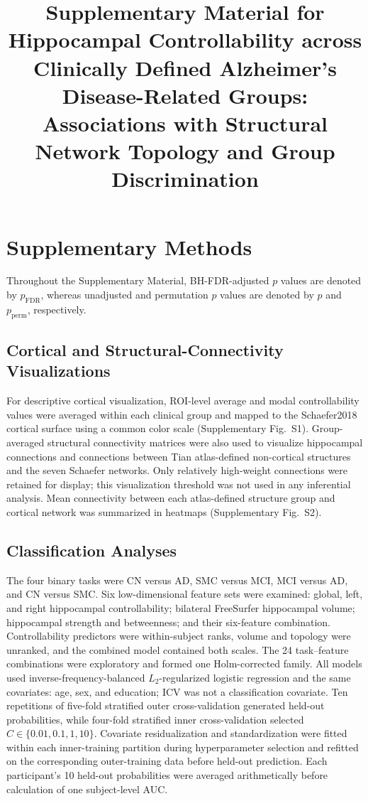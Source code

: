 \documentclass{article}
\title{Supplementary Material for Hippocampal Controllability across Clinically Defined Alzheimer's Disease-Related Groups: Associations with Structural Network Topology and Group Discrimination}
\author{}
\date{}
\begin{document}
\maketitle

\section{Supplementary Methods}

Throughout the Supplementary Material, BH-FDR-adjusted \(p\) values are denoted by \(p_{\mathrm{FDR}}\), whereas unadjusted and permutation \(p\) values are denoted by \(p\) and \(p_{\mathrm{perm}}\), respectively.

\subsection{Cortical and Structural-Connectivity Visualizations}
For descriptive cortical visualization, ROI-level average and modal controllability values were averaged within each clinical group and mapped to the Schaefer2018 cortical surface using a common color scale (Supplementary Fig.~S1). Group-averaged structural connectivity matrices were also used to visualize hippocampal connections and connections between Tian atlas-defined non-cortical structures and the seven Schaefer networks. Only relatively high-weight connections were retained for display; this visualization threshold was not used in any inferential analysis. Mean connectivity between each atlas-defined structure group and cortical network was summarized in heatmaps (Supplementary Fig.~S2).

\subsection{Classification Analyses}
The four binary tasks were CN versus AD, SMC versus MCI, MCI versus AD, and CN versus SMC. Six low-dimensional feature sets were examined: global, left, and right hippocampal controllability; bilateral FreeSurfer hippocampal volume; hippocampal strength and betweenness; and their six-feature combination. Controllability predictors were within-subject ranks, volume and topology were unranked, and the combined model contained both scales. The 24 task--feature combinations were exploratory and formed one Holm-corrected family. All models used inverse-frequency-balanced \(L_2\)-regularized logistic regression and the same covariates: age, sex, and education; ICV was not a classification covariate. Ten repetitions of five-fold stratified outer cross-validation generated held-out probabilities, while four-fold stratified inner cross-validation selected \(C\in\{0.01,0.1,1,10\}\). Covariate residualization and standardization were fitted within each inner-training partition during hyperparameter selection and refitted on the corresponding outer-training data before held-out prediction. Each participant's 10 held-out probabilities were averaged arithmetically before calculation of one subject-level AUC.
\end{document}
